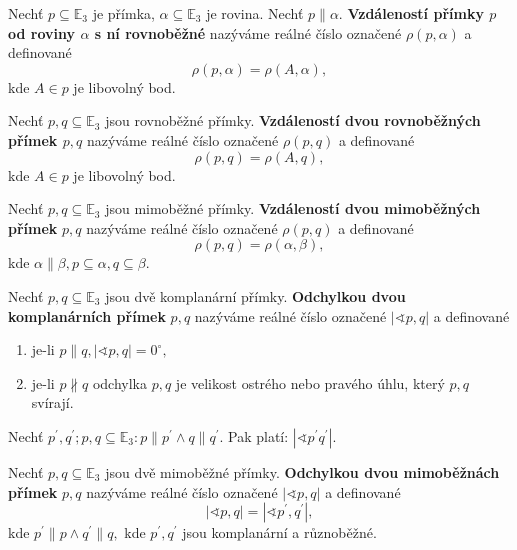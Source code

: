 \begin{definition}
    Nechť $p\subseteq \mathbb E_3$ je přímka, $\alpha \subseteq \mathbb E_3$ je rovina.
    Nechť $p\parallel \alpha.$ \textbf{Vzdáleností přímky $p$ od roviny $\alpha$
    s ní rovnoběžné} nazýváme reálné číslo označené $\rho(p,\alpha)$ a definované
    $$\rho(p,\alpha)=\rho(A,\alpha),$$
    kde $A\in p$ je libovolný bod.
\end{definition}

\begin{definition}
    Nechť $p,q\subseteq \mathbb E_3$ jsou rovnoběžné přímky. \textbf{Vzdáleností
    dvou rovnoběžných přímek $p,q$} nazýváme reálné číslo označené $\rho(p,q)$ a
    definované
    $$\rho(p,q) = \rho(A,q),$$
    kde $A\in p$ je libovolný bod.
\end{definition}

\begin{definition}
    Nechť $p,q\subseteq \mathbb E_3$ jsou mimoběžné přímky. \textbf{Vzdáleností dvou
    mimoběžných přímek} $p,q$ nazýváme reálné číslo označené $\rho(p,q)$ a definované
    $$\rho(p,q)=\rho(\alpha, \beta),$$
    kde $\alpha \parallel \beta, p\subseteq\alpha, q\subseteq \beta.$
\end{definition}

\begin{definition}
    Nechť $p,q\subseteq \mathbb E_3$ jsou dvě komplanární přímky. \textbf{Odchylkou
    dvou komplanárních přímek} $p,q$ nazýváme reálné číslo označené $|\sphericalangle
    p,q|$ a definované
    \begin{enumerate}[$i.$]
    \item je-li $p\parallel q, |\sphericalangle p,q|=0^\circ,$
   	\item je-li $p\nparallel q$ odchylka $p,q$ je velikost ostrého nebo pravého úhlu,
        který $p,q$ svírají.
    \end{enumerate}
\end{definition}

\begin{veta}
    Nechť $p^\prime, q^\prime; p,q\subseteq \mathbb E_3: p\parallel p^\prime\land
    q\parallel q^\prime.$ Pak platí: $|\sphericalangle p^\prime q^\prime|.$
\end{veta}

\begin{definition}
    Nechť $p,q\subseteq \mathbb E_3$ jsou dvě mimoběžné přímky. \textbf{Odchylkou
    dvou mimoběžnách přímek} $p,q$ nazýváme reálné číslo označené $|\sphericalangle
    p,q|$ a definované
    $$|\sphericalangle p,q| = |\sphericalangle p^\prime, q^\prime|,$$
    kde $p^\prime \parallel p \land q^\prime \parallel q,$ kde $p^\prime, q^\prime$
    jsou komplanární a různoběžné.
\end{definition}

